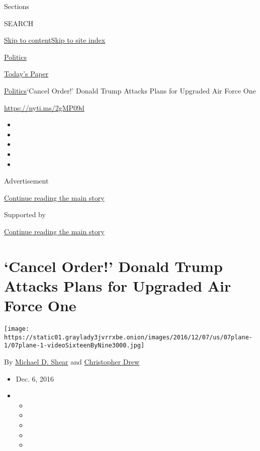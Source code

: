 Sections

SEARCH

\protect\hyperlink{site-content}{Skip to
content}\protect\hyperlink{site-index}{Skip to site index}

\href{https://www.nytimes3xbfgragh.onion/section/politics}{Politics}

\href{https://myaccount.nytimes3xbfgragh.onion/auth/login?response_type=cookie\&client_id=vi}{}

\href{https://www.nytimes3xbfgragh.onion/section/todayspaper}{Today's
Paper}

\href{/section/politics}{Politics}\textbar{}`Cancel Order!' Donald Trump
Attacks Plans for Upgraded Air Force One

\url{https://nyti.ms/2gMP09d}

\begin{itemize}
\item
\item
\item
\item
\item
\end{itemize}

Advertisement

\protect\hyperlink{after-top}{Continue reading the main story}

Supported by

\protect\hyperlink{after-sponsor}{Continue reading the main story}

\hypertarget{cancel-order-donald-trump-attacks-plans-for-upgraded-air-force-one}{%
\section{`Cancel Order!' Donald Trump Attacks Plans for Upgraded Air
Force
One}\label{cancel-order-donald-trump-attacks-plans-for-upgraded-air-force-one}}

\texttt{[image: https://static01.graylady3jvrrxbe.onion/images/2016/12/07/us/07plane-1/07plane-1-videoSixteenByNine3000.jpg]}

By \href{http://www.nytimes3xbfgragh.onion/by/michael-d-shear}{Michael
D. Shear} and
\href{http://www.nytimes3xbfgragh.onion/by/christopher-drew}{Christopher
Drew}

\begin{itemize}
\item
  Dec. 6, 2016
\item
  \begin{itemize}
  \item
  \item
  \item
  \item
  \item
  \end{itemize}
\end{itemize}

